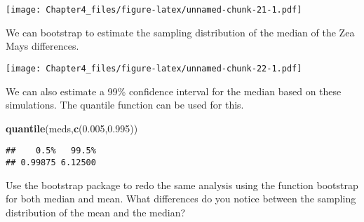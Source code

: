 \documentclass[]{article}
\newenvironment{Shaded}{\begin{snugshade}}{\end{snugshade}}
\newcommand{\DataTypeTok}[1]{\textcolor[rgb]{0.13,0.29,0.53}{#1}}
\newcommand{\DecValTok}[1]{\textcolor[rgb]{0.00,0.00,0.81}{#1}}
\newcommand{\FloatTok}[1]{\textcolor[rgb]{0.00,0.00,0.81}{#1}}
\newcommand{\KeywordTok}[1]{\textcolor[rgb]{0.13,0.29,0.53}{\textbf{#1}}}
\newcommand{\NormalTok}[1]{#1}
\newcommand{\OperatorTok}[1]{\textcolor[rgb]{0.81,0.36,0.00}{\textbf{#1}}}
\newcommand{\OtherTok}[1]{\textcolor[rgb]{0.56,0.35,0.01}{#1}}
\newcommand{\StringTok}[1]{\textcolor[rgb]{0.31,0.60,0.02}{#1}}
\begin{document}
\texttt{[image: Chapter4\_files/figure-latex/unnamed-chunk-21-1.pdf]}

We can bootstrap to estimate the sampling distribution of the median of
the Zea Mays differences.

\begin{Shaded}
\end{Shaded}

\texttt{[image: Chapter4\_files/figure-latex/unnamed-chunk-22-1.pdf]}

We can also estimate a 99\% confidence interval for the median based on
these simulations. The quantile function can be used for this.

\begin{Shaded}
\begin{Highlighting}[]
\KeywordTok{quantile}\NormalTok{(meds,}\KeywordTok{c}\NormalTok{(}\FloatTok{0.005}\NormalTok{,}\FloatTok{0.995}\NormalTok{))}
\end{Highlighting}
\end{Shaded}

\begin{verbatim}
##    0.5%   99.5% 
## 0.99875 6.12500
\end{verbatim}

Use the bootstrap package to redo the same analysis using the function
bootstrap for both median and mean. What differences do you notice
between the sampling distribution of the mean and the median?

\begin{Shaded}
\end{Shaded}
\end{document}
